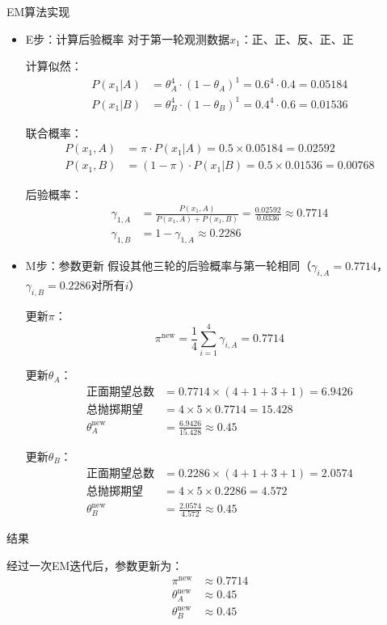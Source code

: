 \documentclass{article}
\begin{document}
EM算法实现
\begin{itemize}
	
\item{E步：计算后验概率}
对于第一轮观测数据$x_1$：正、正、反、正、正

计算似然：
\begin{align*}
	P(x_1|A) &= \theta_A^{4} \cdot (1-\theta_A)^{1} = 0.6^4 \cdot 0.4 = 0.05184 \\
	P(x_1|B) &= \theta_B^{4} \cdot (1-\theta_B)^{1} = 0.4^4 \cdot 0.6 = 0.01536
\end{align*}

联合概率：
\begin{align*}
	P(x_1,A) &= \pi \cdot P(x_1|A) = 0.5 \times 0.05184 = 0.02592 \\
	P(x_1,B) &= (1-\pi) \cdot P(x_1|B) = 0.5 \times 0.01536 = 0.00768
\end{align*}

后验概率：
\begin{align*}
	\gamma_{1,A} &= \frac{P(x_1,A)}{P(x_1,A)+P(x_1,B)} = \frac{0.02592}{0.0336} \approx 0.7714 \\
	\gamma_{1,B} &= 1 - \gamma_{1,A} \approx 0.2286
\end{align*}

\item{M步：参数更新}
假设其他三轮的后验概率与第一轮相同（$\gamma_{i,A}=0.7714$，$\gamma_{i,B}=0.2286$对所有$i$）

更新$\pi$：
\[
\pi^{\text{new}} = \frac{1}{4}\sum_{i=1}^4 \gamma_{i,A} = 0.7714
\]

更新$\theta_A$：
\begin{align*}
	\text{正面期望总数} &= 0.7714 \times (4+1+3+1) = 6.9426 \\
	\text{总抛掷期望} &= 4 \times 5 \times 0.7714 = 15.428 \\
	\theta_A^{\text{new}} &= \frac{6.9426}{15.428} \approx 0.45
\end{align*}

更新$\theta_B$：
\begin{align*}
	\text{正面期望总数} &= 0.2286 \times (4+1+3+1) = 2.0574 \\
	\text{总抛掷期望} &= 4 \times 5 \times 0.2286 = 4.572 \\
	\theta_B^{\text{new}} &= \frac{2.0574}{4.572} \approx 0.45
\end{align*}
\end{itemize}

结果

经过一次EM迭代后，参数更新为：
\begin{align*}
	\pi^{\text{new}} &\approx 0.7714 \\
	\theta_A^{\text{new}} &\approx 0.45 \\
	\theta_B^{\text{new}} &\approx 0.45
\end{align*}
\end{document}
